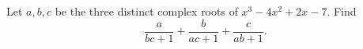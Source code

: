 Let $a,b,c$ be the three distinct complex roots of $x^3-4x^2+2x-7$. Find
\[
\dfrac{a}{bc+1}+\dfrac{b}{ac+1}+\dfrac{c}{ab+1}.
\]
